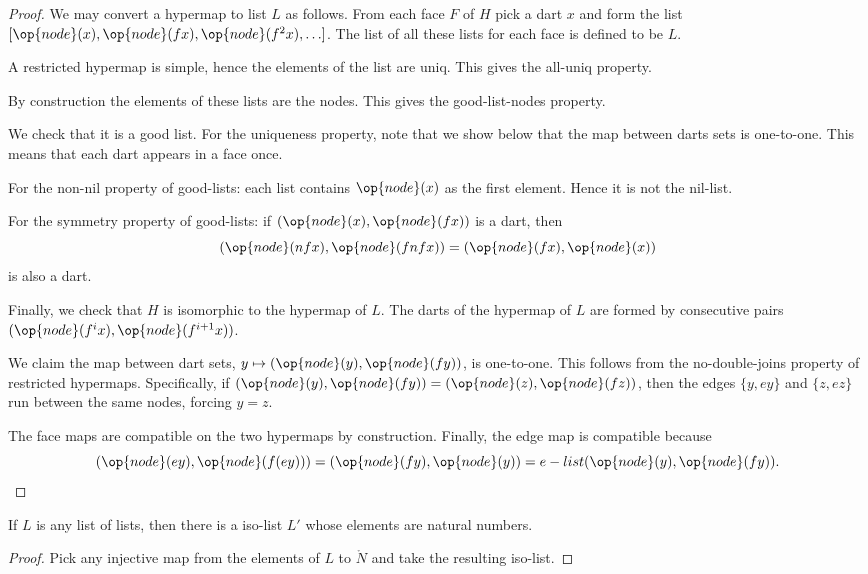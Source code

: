 \begin{proof} We may convert a hypermap to list $L$ as follows.  From each face $F$ of $H$
pick a dart $x$ and form the list $[\op{node}(x),\op{node}(f x),\op{node}(f^2 x),\ldots]$.  
The list of all these lists for each face is defined to be $L$.

A restricted hypermap is simple, hence the elements of the list are uniq.  This gives the all-uniq property.

By construction the elements of these lists are the nodes.  This gives the good-list-nodes property.

We check that it is a good list.  
For the uniqueness property, note that we show below that the map between darts sets is one-to-one.
This means that each dart appears in a face once.

For the non-nil property of good-lists: each list contains $\op{node}(x)$ as the first element. Hence it is
not the nil-list.

For the symmetry property of good-lists: if $(\op{node}(x),\op{node}(f x))$ is a dart, then
\[
(\op{node}(n f x),\op{node}(f n f x)) = (\op{node}(f x),\op{node}(x))
\]
is also a dart.

Finally, we check that $H$ is isomorphic to the hypermap of $L$.  The darts of the hypermap of $L$ are formed by
consecutive pairs $(\op{node}(f^i x),\op{node}(f^{i+1} x))$.  

We claim the map between dart sets, $y\mapsto (\op{node}(y),\op{node}(f y))$, is one-to-one.
This follows from the no-double-joins property of restricted hypermaps.  Specifically,
if $(\op{node}(y),\op{node}(f y)) = (\op{node}(z),\op{node}(f z))$, then the edges $\{y,e y\}$ and $\{z,ez\}$ run
between the same nodes, forcing $y=z$.

The face maps are compatible on the two hypermaps by construction. Finally, the edge map is compatible because
\[
(\op{node}(e y),\op{node}(f (e y))) = (\op{node}(f y),\op{node}(y)) = e-list (\op{node}(y),\op{node}(f y)).
\]
\end{proof}

\begin{lemma}
If $L$ is any list of lists, then there is a iso-list $L'$ whose elements are natural numbers.
\end{lemma}

\begin{proof} Pick any injective map from the elements of $L$ to $\ring{N}$ and take the resulting iso-list.
\end{proof}

